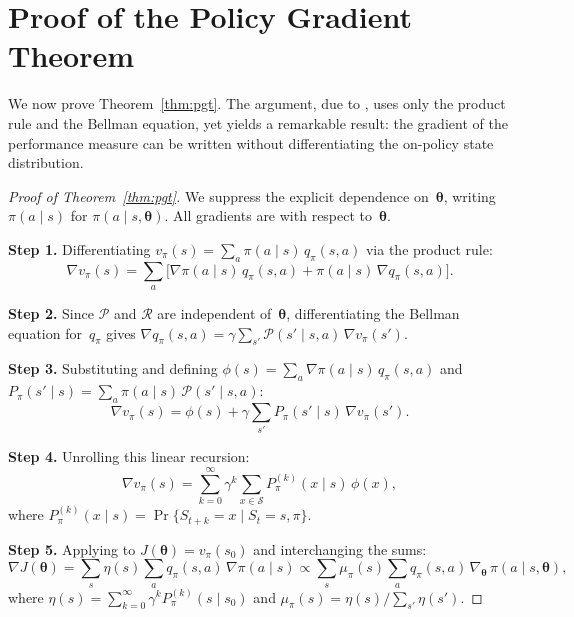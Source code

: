 
\chapter{Proof of the Policy Gradient Theorem}
\label{ch:pgt-proof}

We now prove Theorem~\ref{thm:pgt}. The argument, due to \cite{sutton2018rl}, uses only the product rule and the Bellman equation, yet yields a remarkable result: the gradient of the performance measure can be written without differentiating the on-policy state distribution.

\begin{proof}[Proof of Theorem~\ref{thm:pgt}]
We suppress the explicit dependence on~$\bm{\theta}$, writing $\pi(a\mid s)$ for $\pi(a\mid s,\bm{\theta})$. All gradients are with respect to~$\bm{\theta}$.

\medskip\noindent\textbf{Step 1.}\quad
Differentiating $v_\pi(s) = \sum_a \pi(a\mid s)\,q_\pi(s,a)$ via the product rule:
\begin{equation}\label{eq:grad-v-step1}
  \nabla v_\pi(s) = \sum_a \bigl[\nabla\pi(a\mid s)\,q_\pi(s,a) + \pi(a\mid s)\,\nabla q_\pi(s,a)\bigr].
\end{equation}

\medskip\noindent\textbf{Step 2.}\quad
Since $\mathcal{P}$ and $\mathcal{R}$ are independent of~$\bm{\theta}$, differentiating the Bellman equation for~$q_\pi$ gives $\nabla q_\pi(s,a) = \gamma\sum_{s'}\mathcal{P}(s'\mid s,a)\,\nabla v_\pi(s')$.

\medskip\noindent\textbf{Step 3.}\quad
Substituting and defining $\phi(s) = \sum_a \nabla\pi(a\mid s)\,q_\pi(s,a)$ and $P_\pi(s'\mid s) = \sum_a \pi(a\mid s)\,\mathcal{P}(s'\mid s,a)$:
\begin{equation}\label{eq:grad-v-recursive}
  \nabla v_\pi(s) = \phi(s) + \gamma\sum_{s'} P_\pi(s'\mid s)\,\nabla v_\pi(s').
\end{equation}

\medskip\noindent\textbf{Step 4.}\quad
Unrolling this linear recursion:
\begin{equation}\label{eq:unrolled}
  \nabla v_\pi(s) = \sum_{k=0}^{\infty}\gamma^k\sum_{x\in\mathcal{S}} P_\pi^{(k)}(x\mid s)\,\phi(x),
\end{equation}
where $P_\pi^{(k)}(x\mid s) = \Pr\{S_{t+k}=x\mid S_t=s,\pi\}$.

\medskip\noindent\textbf{Step 5.}\quad
Applying to $J(\bm{\theta})=v_\pi(s_0)$ and interchanging the sums:
\[
  \nabla J(\bm{\theta}) = \sum_s \eta(s)\sum_a q_\pi(s,a)\,\nabla\pi(a\mid s) \propto \sum_s \mu_\pi(s)\sum_a q_\pi(s,a)\,\nabla_{\bm{\theta}}\,\pi(a\mid s,\bm{\theta}),
\]
where $\eta(s)=\sum_{k=0}^\infty \gamma^k P_\pi^{(k)}(s\mid s_0)$ and $\mu_\pi(s)=\eta(s)/\sum_{s'}\eta(s')$.
\end{proof}

